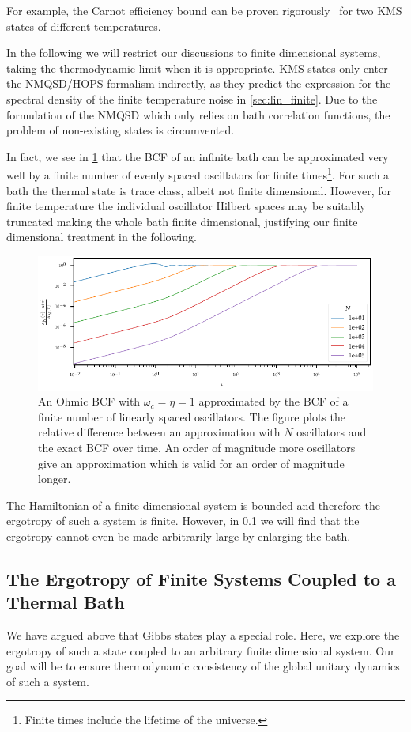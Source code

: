 For example, the Carnot efficiency bound can be proven
rigorously~\cite{Pusz1978Oct} for two KMS states of different
temperatures.

In the following we will restrict our discussions to finite
dimensional systems, taking the thermodynamic limit when it is
appropriate. KMS states only enter the NMQSD/HOPS formalism
indirectly, as they predict the expression for the spectral density of
the finite temperature noise in \cref{sec:lin_finite}. Due to the
formulation of the NMQSD which only relies on bath correlation
functions, the problem of non-existing states is circumvented.

In fact, we see in \cref{fig:bcf_approx} that the BCF of an infinite
bath can be approximated very well by a finite number of evenly spaced
oscillators for finite times\footnote{Finite times include the
  lifetime of the universe.}. For such a bath the thermal state is
trace class, albeit not finite dimensional. However, for finite
temperature the individual oscillator Hilbert spaces may be suitably
truncated making the whole bath finite dimensional, justifying our
finite dimensional treatment in the following.
\begin{figure}[htp]
  \centering
  \includegraphics{figs/misc/bcf_approx}
  \caption{\label{fig:bcf_approx} An Ohmic BCF with \(ω_{c}=η=1\)
    approximated by the BCF of a finite number of linearly spaced
    oscillators. The figure plots the relative difference between an
    approximation with \(N\) oscillators and the exact BCF over
    time. An order of magnitude more oscillators give an approximation
    which is valid for an order of magnitude longer.}
\end{figure}

The Hamiltonian of a finite dimensional system is bounded and
therefore the ergotropy of such a system is finite. However, in \cref{sec:ergoonebath} we will find that the ergotropy cannot even be made
arbitrarily large by enlarging the bath.

\subsection{The Ergotropy of Finite Systems Coupled to a Thermal Bath}
\label{sec:ergoonebath}
We have argued above that Gibbs states play a special role. Here, we
explore the ergotropy of such a state coupled to an arbitrary finite
dimensional system. Our goal will be to ensure thermodynamic
consistency of the global unitary dynamics of such a system.

